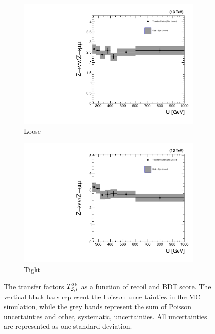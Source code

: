 \begin{figure}[]
    \begin{center}
        \begin{subfigure}[t]{0.49\textwidth}
            \includegraphics[width=\textwidth]{figures/monotop/xfer/rfactor_dimuon_loose.pdf}
            \caption{Loose}
        \end{subfigure}
        \begin{subfigure}[t]{0.49\textwidth}
            \includegraphics[width=\textwidth]{figures/monotop/xfer/rfactor_dimuon.pdf}
            \caption{Tight}
        \end{subfigure}
        \caption{The transfer factors ${T}^{\mu\mu}_{Z,i}$ as a function of recoil and BDT score. The vertical black bars represent the Poisson uncertainties in the MC simulation, while the grey bands represent the sum of Poisson uncertainties and other, systematic, uncertainties. All uncertainties are represented as one standard deviation.}
        \label{fig:mt:zmm_xfer}
    \end{center}
\end{figure}

